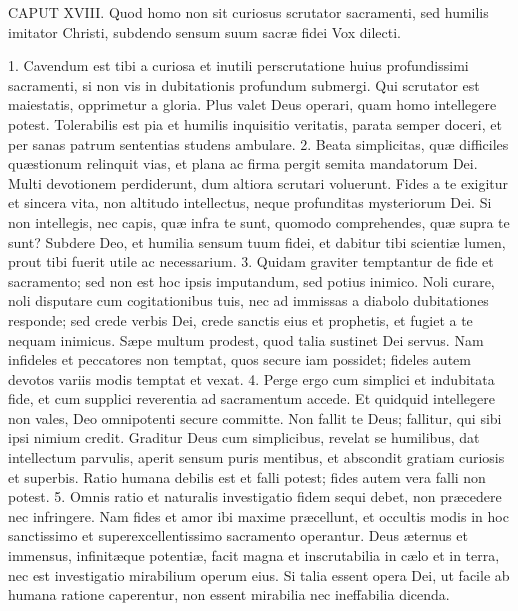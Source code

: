 CAPUT XVIII.
Quod homo non sit curiosus scrutator sacramenti, sed humilis imitator Christi, subdendo sensum suum sacræ fidei
Vox dilecti.

1. Cavendum est tibi a curiosa et inutili perscrutatione huius profundissimi sacramenti, si non vis in dubitationis profundum submergi. Qui scrutator est maiestatis, opprimetur a gloria. Plus valet Deus operari, quam homo intellegere potest. Tolerabilis est pia et humilis inquisitio veritatis, parata semper doceri, et per sanas patrum sententias studens ambulare.
2. Beata simplicitas, quæ difficiles quæstionum relinquit vias, et plana ac firma pergit semita mandatorum Dei. Multi devotionem perdiderunt, dum altiora scrutari voluerunt. Fides a te exigitur et sincera vita, non altitudo intellectus, neque profunditas mysteriorum Dei. Si non intellegis, nec capis, quæ infra te sunt, quomodo comprehendes, quæ supra te sunt? Subdere Deo, et humilia sensum tuum fidei, et dabitur tibi scientiæ lumen, prout tibi fuerit utile ac necessarium.
3. Quidam graviter temptantur de fide et sacramento; sed non est hoc ipsis imputandum, sed potius inimico. Noli curare, noli disputare cum cogitationibus tuis, nec ad immissas a diabolo dubitationes responde; sed crede verbis Dei, crede sanctis eius et prophetis, et fugiet a te nequam inimicus. Sæpe multum prodest, quod talia sustinet Dei servus. Nam infideles et peccatores non temptat, quos secure iam possidet; fideles autem devotos variis modis temptat et vexat.
4. Perge ergo cum simplici et indubitata fide, et cum supplici reverentia ad sacramentum accede. Et quidquid intellegere non vales, Deo omnipotenti secure committe. Non fallit te Deus; fallitur, qui sibi ipsi nimium credit. Graditur Deus cum simplicibus, revelat se humilibus, dat intellectum parvulis, aperit sensum puris mentibus, et abscondit gratiam curiosis et superbis. Ratio humana debilis est et falli potest; fides autem vera falli non potest.
5. Omnis ratio et naturalis investigatio fidem sequi debet, non præcedere nec infringere. Nam fides et amor ibi maxime præcellunt, et occultis modis in hoc sanctissimo et superexcellentissimo sacramento operantur. Deus æternus et immensus, infinitæque potentiæ, facit magna et inscrutabilia in cælo et in terra, nec est investigatio mirabilium operum eius. Si talia essent opera Dei, ut facile ab humana ratione caperentur, non essent mirabilia nec ineffabilia dicenda.



